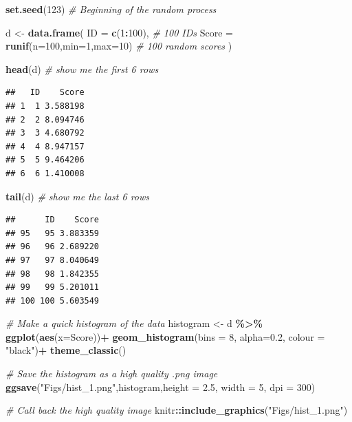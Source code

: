 \documentclass[
]{book}
\newenvironment{Shaded}{\begin{snugshade}}{\end{snugshade}}
\newcommand{\AttributeTok}[1]{\textcolor[rgb]{0.13,0.29,0.53}{#1}}
\newcommand{\CommentTok}[1]{\textcolor[rgb]{0.56,0.35,0.01}{\textit{#1}}}
\newcommand{\DecValTok}[1]{\textcolor[rgb]{0.00,0.00,0.81}{#1}}
\newcommand{\FloatTok}[1]{\textcolor[rgb]{0.00,0.00,0.81}{#1}}
\newcommand{\FunctionTok}[1]{\textcolor[rgb]{0.13,0.29,0.53}{\textbf{#1}}}
\newcommand{\NormalTok}[1]{#1}
\newcommand{\OtherTok}[1]{\textcolor[rgb]{0.56,0.35,0.01}{#1}}
\newcommand{\SpecialCharTok}[1]{\textcolor[rgb]{0.81,0.36,0.00}{\textbf{#1}}}
\newcommand{\StringTok}[1]{\textcolor[rgb]{0.31,0.60,0.02}{#1}}
\begin{document}
\begin{Shaded}
\begin{Highlighting}[]
\FunctionTok{set.seed}\NormalTok{(}\DecValTok{123}\NormalTok{) }\CommentTok{\# Beginning of the random process}

\NormalTok{d }\OtherTok{\textless{}{-}} \FunctionTok{data.frame}\NormalTok{(}
  \AttributeTok{ID =} \FunctionTok{c}\NormalTok{(}\DecValTok{1}\SpecialCharTok{:}\DecValTok{100}\NormalTok{), }\CommentTok{\# 100 IDs}
  \AttributeTok{Score =} \FunctionTok{runif}\NormalTok{(}\AttributeTok{n=}\DecValTok{100}\NormalTok{,}\AttributeTok{min=}\DecValTok{1}\NormalTok{,}\AttributeTok{max=}\DecValTok{10}\NormalTok{) }\CommentTok{\# 100 random scores}
\NormalTok{)}

\FunctionTok{head}\NormalTok{(d) }\CommentTok{\# show me the first 6 rows}
\end{Highlighting}
\end{Shaded}

\begin{verbatim}
##   ID    Score
## 1  1 3.588198
## 2  2 8.094746
## 3  3 4.680792
## 4  4 8.947157
## 5  5 9.464206
## 6  6 1.410008
\end{verbatim}

\begin{Shaded}
\begin{Highlighting}[]
\FunctionTok{tail}\NormalTok{(d) }\CommentTok{\# show me the last 6 rows}
\end{Highlighting}
\end{Shaded}

\begin{verbatim}
##      ID    Score
## 95   95 3.883359
## 96   96 2.689220
## 97   97 8.040649
## 98   98 1.842355
## 99   99 5.201011
## 100 100 5.603549
\end{verbatim}

\begin{Shaded}
\begin{Highlighting}[]
\CommentTok{\# Make a quick histogram of the data}
\NormalTok{histogram }\OtherTok{\textless{}{-}}\NormalTok{ d }\SpecialCharTok{\%\textgreater{}\%}
  \FunctionTok{ggplot}\NormalTok{(}\FunctionTok{aes}\NormalTok{(}\AttributeTok{x=}\NormalTok{Score))}\SpecialCharTok{+}
  \FunctionTok{geom\_histogram}\NormalTok{(}\AttributeTok{bins =} \DecValTok{8}\NormalTok{, }\AttributeTok{alpha=}\FloatTok{0.2}\NormalTok{, }\AttributeTok{colour =} \StringTok{"black"}\NormalTok{)}\SpecialCharTok{+}
  \FunctionTok{theme\_classic}\NormalTok{()}

\CommentTok{\# Save the histogram as a high quality .png image}
\FunctionTok{ggsave}\NormalTok{(}\StringTok{"Figs/hist\_1.png"}\NormalTok{,histogram,}\AttributeTok{height =} \FloatTok{2.5}\NormalTok{, }\AttributeTok{width =} \DecValTok{5}\NormalTok{, }\AttributeTok{dpi =} \DecValTok{300}\NormalTok{)}

\CommentTok{\# Call back the high quality image }
\NormalTok{knitr}\SpecialCharTok{::}\FunctionTok{include\_graphics}\NormalTok{(}\StringTok{"Figs/hist\_1.png"}\NormalTok{)}
\end{Highlighting}
\end{Shaded}
\end{document}
